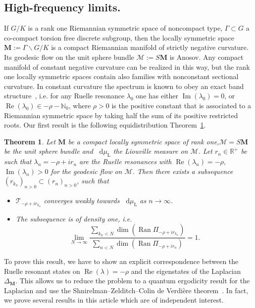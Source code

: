 \documentclass[10pt]{amsart}
\newtheorem{theo}[cdrthm]{Theorem}
\theoremstyle{definition}
\DeclareMathOperator{\Imag}{Im}
\DeclareMathOperator{\Real}{Re}
\DeclareMathOperator{\Ran}{Ran}
\newcommand{\rml}{\mathrm{L}}
\newcommand{\bfm}{\mathbf{M}}
\newcommand{\la}{\lambda}
\let\Im=\Imag
\let\Re=\Real
\renewcommand{\Re}{\operatorname{Re}}
\renewcommand{\Im}{\operatorname{Im}}
\newcommand{\N}{\mathbb{N}}
\newcommand{\R}{\mathbb R}
\newcommand{\intd}{\mathop{}\!\mathrm{d}}
\begin{document}
\subsection{High-frequency limits.}
If $G/K$ is a rank one Riemannian symmetric space of noncompact type, $\Gamma\subset G$ a co-compact torsion free discrete subgroup, then the locally symmetric space $\mathbf M:= \Gamma\backslash G/K$ is a compact Riemannian manifold of strictly negative curvature. Its geodesic flow on the unit sphere bundle $\mathcal M:= S\mathbf M$ is Anosov. Any compact manifold of constant negative curvature can be realized in this way, but the rank one locally symmetric spaces contain also families with nonconstant sectional curvature. In constant curvature the spectrum is known to obey an exact band structure~\cite{DFG15, KW19a}, i.e. for any Ruelle resonance $\lambda_0$ one has either $\Imag(\lambda_0)=0$, or $\Real(\lambda_0) \in -\rho - \N_0$, where $\rho>0$ is the positive constant that is associated to a Riemannian symmetric space by taking half the sum of its positive restricted roots. Our first result is the following equidistribution Theorem~\ref{thm: Main Theorem}.


\begin{theo}\label{thm: Main Theorem}
Let $\mathbf M$ be a compact locally symmetric space of rank one,\linebreak	$\mathcal M=S\mathbf M$ be the unit sphere bundle and $\intd\mu_{\rml}$ the Liouville measure on $\mathcal M$. Let $r_n\in \R^+$ be such that $\lambda_n=-\rho+ir_n$ are the Ruelle resonances with $\Re(\lambda_n)=-\rho$, $\Im(\lambda_n)>0$ for the geodesic flow on $\mathcal M$. Then there exists a subsequence $(r_{k_n})_{n>0}\subset (r_n)_{n>0}$, such that
\begin{itemize}
\item $\mathcal T_{-\rho + ir_{k_n}}$ converges weakly towards $\intd \mu_{\rml}$ as $n\to\infty$.
\item The subsequence is of density one, i.e.
\[
\lim_{N\to\infty}\frac{\sum_{k_n<N} \dim(\Ran\Pi_{-\rho + ir_{k_n}})}{\sum_{n<N} \dim(\Ran\Pi_{-\rho + ir_n})}=1.
\]
\end{itemize}
\end{theo}


To prove this result, we have to show an explicit correspondence between the Ruelle resonant states on ${\Real}(\la)=-\rho$ and the eigenstates of the Laplacian $\Delta_{\bfm}$. This allows us to reduce the problem to a quantum ergodicity result for the Laplacian and use the Shnirelman--Zelditch--Colin de Verdière theorem~\cite{CdV85,Shn74,Zel87}. In fact, we prove several results in this article which are of independent interest.
\end{document}
